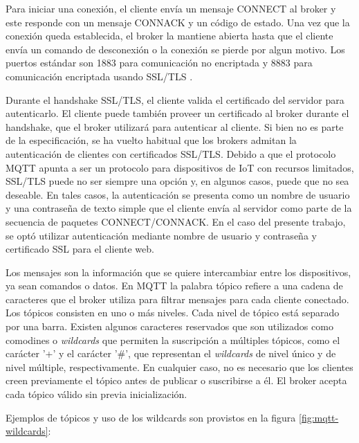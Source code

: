Para iniciar una conexión, el cliente envía un mensaje CONNECT al broker y este responde con un mensaje CONNACK y un código de estado. Una vez que la conexión queda establecida, el broker la mantiene abierta hasta que el cliente envía un comando de desconexión o la conexión se pierde por algun motivo. Los puertos estándar son 1883 para comunicación no encriptada y 8883 para comunicación encriptada usando SSL/TLS \citep{WEBSITE:17}.

Durante el handshake SSL/TLS, el cliente valida el certificado del servidor para autenticarlo. El cliente puede también proveer un certificado al broker durante el handshake, que el broker utilizará para autenticar al cliente. Si bien no es parte de la especificación, se ha vuelto habitual que los brokers admitan la autenticación de clientes con certificados SSL/TLS. Debido a que el protocolo MQTT apunta a ser un protocolo para dispositivos de IoT con recursos limitados, SSL/TLS puede no ser siempre una opción y, en algunos casos, puede que no sea deseable. En tales casos, la autenticación se presenta como un nombre de usuario y una contraseña de texto simple que el cliente envía al servidor como parte de la secuencia de paquetes CONNECT/CONNACK.  En el caso del presente trabajo, se optó utilizar autenticación mediante nombre de usuario y contraseña y certificado SSL para el cliente web.

Los mensajes son la información que se quiere intercambiar entre los dispositivos, ya sean comandos o datos. En MQTT la palabra tópico refiere a una cadena de caracteres que el broker utiliza para filtrar mensajes para cada cliente conectado. Los tópicos consisten en uno o más niveles. Cada nivel de tópico está separado por una barra. Existen algunos caracteres reservados que son utilizados como comodines o \textit{wildcards} que permiten la suscripción a múltiples tópicos, como el carácter '+' y el carácter '\#', que representan el  \textit{wildcards} de nivel único y de nivel múltiple, respectivamente. En cualquier caso, no es necesario que los clientes creen previamente el tópico antes de publicar o suscribirse a él. El broker acepta cada tópico válido sin previa inicialización.

Ejemplos de tópicos y uso de los wildcards son provistos en la figura \ref{fig:mqtt-wildcards}:

